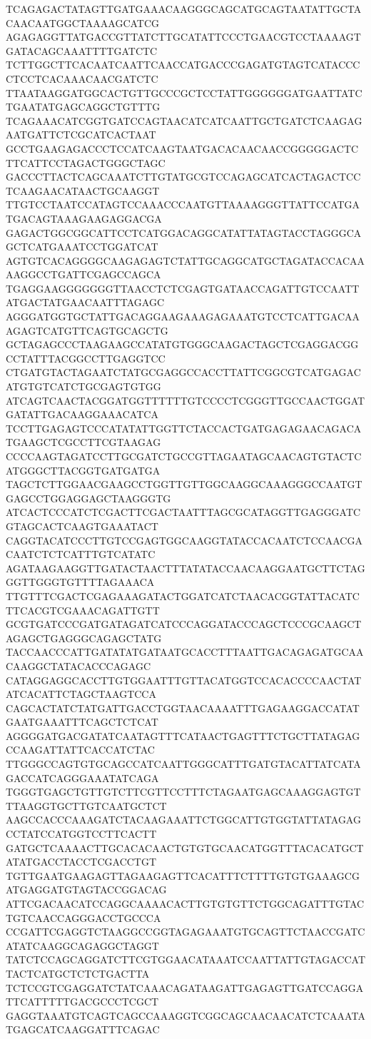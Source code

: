 TCAGAGACTATAGTTGATGAAACAAGGGCAGCATGCAGTAATATTGCTACAACAATGGCTAAAAGCATCG
AGAGAGGTTATGACCGTTATCTTGCATATTCCCTGAACGTCCTAAAAGTGATACAGCAAATTTTGATCTC
TCTTGGCTTCACAATCAATTCAACCATGACCCGAGATGTAGTCATACCCCTCCTCACAAACAACGATCTC
TTAATAAGGATGGCACTGTTGCCCGCTCCTATTGGGGGGATGAATTATCTGAATATGAGCAGGCTGTTTG
TCAGAAACATCGGTGATCCAGTAACATCATCAATTGCTGATCTCAAGAGAATGATTCTCGCATCACTAAT
GCCTGAAGAGACCCTCCATCAAGTAATGACACAACAACCGGGGGACTCTTCATTCCTAGACTGGGCTAGC
GACCCTTACTCAGCAAATCTTGTATGCGTCCAGAGCATCACTAGACTCCTCAAGAACATAACTGCAAGGT
TTGTCCTAATCCATAGTCCAAACCCAATGTTAAAAGGGTTATTCCATGATGACAGTAAAGAAGAGGACGA
GAGACTGGCGGCATTCCTCATGGACAGGCATATTATAGTACCTAGGGCAGCTCATGAAATCCTGGATCAT
AGTGTCACAGGGGCAAGAGAGTCTATTGCAGGCATGCTAGATACCACAAAAGGCCTGATTCGAGCCAGCA
TGAGGAAGGGGGGGTTAACCTCTCGAGTGATAACCAGATTGTCCAATTATGACTATGAACAATTTAGAGC
AGGGATGGTGCTATTGACAGGAAGAAAGAGAAATGTCCTCATTGACAAAGAGTCATGTTCAGTGCAGCTG
GCTAGAGCCCTAAGAAGCCATATGTGGGCAAGACTAGCTCGAGGACGGCCTATTTACGGCCTTGAGGTCC
CTGATGTACTAGAATCTATGCGAGGCCACCTTATTCGGCGTCATGAGACATGTGTCATCTGCGAGTGTGG
ATCAGTCAACTACGGATGGTTTTTTGTCCCCTCGGGTTGCCAACTGGATGATATTGACAAGGAAACATCA
TCCTTGAGAGTCCCATATATTGGTTCTACCACTGATGAGAGAACAGACATGAAGCTCGCCTTCGTAAGAG
CCCCAAGTAGATCCTTGCGATCTGCCGTTAGAATAGCAACAGTGTACTCATGGGCTTACGGTGATGATGA
TAGCTCTTGGAACGAAGCCTGGTTGTTGGCAAGGCAAAGGGCCAATGTGAGCCTGGAGGAGCTAAGGGTG
ATCACTCCCATCTCGACTTCGACTAATTTAGCGCATAGGTTGAGGGATCGTAGCACTCAAGTGAAATACT
CAGGTACATCCCTTGTCCGAGTGGCAAGGTATACCACAATCTCCAACGACAATCTCTCATTTGTCATATC
AGATAAGAAGGTTGATACTAACTTTATATACCAACAAGGAATGCTTCTAGGGTTGGGTGTTTTAGAAACA
TTGTTTCGACTCGAGAAAGATACTGGATCATCTAACACGGTATTACATCTTCACGTCGAAACAGATTGTT
GCGTGATCCCGATGATAGATCATCCCAGGATACCCAGCTCCCGCAAGCTAGAGCTGAGGGCAGAGCTATG
TACCAACCCATTGATATATGATAATGCACCTTTAATTGACAGAGATGCAACAAGGCTATACACCCAGAGC
CATAGGAGGCACCTTGTGGAATTTGTTACATGGTCCACACCCCAACTATATCACATTCTAGCTAAGTCCA
CAGCACTATCTATGATTGACCTGGTAACAAAATTTGAGAAGGACCATATGAATGAAATTTCAGCTCTCAT
AGGGGATGACGATATCAATAGTTTCATAACTGAGTTTCTGCTTATAGAGCCAAGATTATTCACCATCTAC
TTGGGCCAGTGTGCAGCCATCAATTGGGCATTTGATGTACATTATCATAGACCATCAGGGAAATATCAGA
TGGGTGAGCTGTTGTCTTCGTTCCTTTCTAGAATGAGCAAAGGAGTGTTTAAGGTGCTTGTCAATGCTCT
AAGCCACCCAAAGATCTACAAGAAATTCTGGCATTGTGGTATTATAGAGCCTATCCATGGTCCTTCACTT
GATGCTCAAAACTTGCACACAACTGTGTGCAACATGGTTTACACATGCTATATGACCTACCTCGACCTGT
TGTTGAATGAAGAGTTAGAAGAGTTCACATTTCTTTTGTGTGAAAGCGATGAGGATGTAGTACCGGACAG
ATTCGACAACATCCAGGCAAAACACTTGTGTGTTCTGGCAGATTTGTACTGTCAACCAGGGACCTGCCCA
CCGATTCGAGGTCTAAGGCCGGTAGAGAAATGTGCAGTTCTAACCGATCATATCAAGGCAGAGGCTAGGT
TATCTCCAGCAGGATCTTCGTGGAACATAAATCCAATTATTGTAGACCATTACTCATGCTCTCTGACTTA
TCTCCGTCGAGGATCTATCAAACAGATAAGATTGAGAGTTGATCCAGGATTCATTTTTGACGCCCTCGCT
GAGGTAAATGTCAGTCAGCCAAAGGTCGGCAGCAACAACATCTCAAATATGAGCATCAAGGATTTCAGAC
